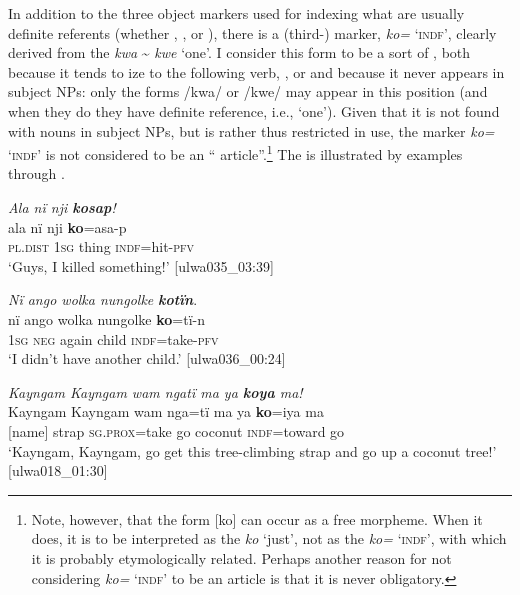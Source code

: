 In addition to the three object markers used for indexing what are usually definite referents (whether , , or ), there is a (third-)  marker, \textit{ko=} ‘\textsc{indf}’, clearly derived from the  \textit{kwa} {\textasciitilde} \textit{kwe} ‘one’. I consider this form to be a sort of , both because it tends to ize to the following verb, , or  and because it never appears in subject NPs: only the forms /kwa/ or /kwe/ may appear in this position (and when they do they have definite reference, i.e., ‘one’). Given that it is not found with nouns in subject NPs, but is rather thus restricted in use, the  marker \textit{ko=} ‘\textsc{indf}’ is not considered to be an “ article”.\footnote{Note, however, that the form [ko] can occur as a free morpheme. When it does, it is to be interpreted as the  \textit{ko} ‘just’, not as the   \textit{ko=} ‘\textsc{indf}’, with which it is probably etymologically related. Perhaps another reason for not considering \textit{ko=} ‘\textsc{indf}’ to be an article is that it is never obligatory.} The   is illustrated by examples  through .


\ea%
    \label{ex:det:59}
          \textit{Ala nï nji \textbf{kosap}!}\\
\gll    ala      nï    nji    \textbf{ko}=asa-p\\
    \textsc{pl.dist}  1\textsc{sg}  thing  \textsc{indf}=hit-\textsc{pfv}\\
\glt `Guys, I killed something!’ [ulwa035\_03:39]
\z

\ea%
    \label{ex:det:60}
          \textit{Nï ango wolka nungolke} \textbf{\textit{kotïn}}.\\
\gll nï    ango  wolka  nungolke  \textbf{ko}=tï-n\\
    1\textsc{sg}  \textsc{neg}  again  child    \textsc{indf=}take-\textsc{pfv}\\
\glt `I didn’t have another child.’ [ulwa036\_00:24]
\z

\ea%
    \label{ex:det:61}
          \textit{Kayngam Kayngam wam ngatï ma ya \textbf{koya} ma!}\\
\gll    Kayngam  Kayngam  wam  nga=tï      ma  ya \textbf{ko}=iya      ma\\
    [name]    [name]    strap  \textsc{sg.prox}=take  go  coconut    \textsc{indf=}toward  go\\
\glt `Kayngam, Kayngam, go get this tree-climbing strap and go up a coconut tree!’ [ulwa018\_01:30]
\z


